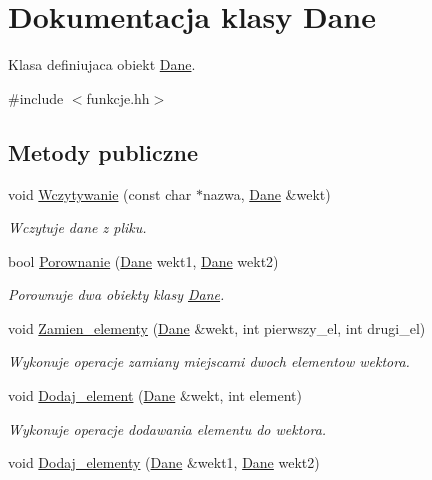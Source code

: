 \hypertarget{class_dane}{\section{\-Dokumentacja klasy \-Dane}
\label{class_dane}
}


\-Klasa definiujaca obiekt \hyperlink{class_dane}{\-Dane}.  




{\ttfamily \#include $<$funkcje.\-hh$>$}

\subsection*{\-Metody publiczne}
\begin{DoxyCompactItemize}
\item 
void \hyperlink{class_dane_a9866194fa136e3ae90a72124fd2dc8cc}{\-Wczytywanie} (const char $\ast$nazwa, \hyperlink{class_dane}{\-Dane} \&wekt)
\begin{DoxyCompactList}\small\item\em \-Wczytuje dane z pliku. \end{DoxyCompactList}\item 
bool \hyperlink{class_dane_a83f86229196e9c4349433e18e89b2e3d}{\-Porownanie} (\hyperlink{class_dane}{\-Dane} wekt1, \hyperlink{class_dane}{\-Dane} wekt2)
\begin{DoxyCompactList}\small\item\em \-Porownuje dwa obiekty klasy \hyperlink{class_dane}{\-Dane}. \end{DoxyCompactList}\item 
void \hyperlink{class_dane_a684a0900c65b3e3174cd3200463be874}{\-Zamien\-\_\-elementy} (\hyperlink{class_dane}{\-Dane} \&wekt, int pierwszy\-\_\-el, int drugi\-\_\-el)
\begin{DoxyCompactList}\small\item\em \-Wykonuje operacje zamiany miejscami dwoch elementow wektora. \end{DoxyCompactList}\item 
void \hyperlink{class_dane_a2bfe7d61ac562f0c420526857d097e47}{\-Dodaj\-\_\-element} (\hyperlink{class_dane}{\-Dane} \&wekt, int element)
\begin{DoxyCompactList}\small\item\em \-Wykonuje operacje dodawania elementu do wektora. \end{DoxyCompactList}\item 
void \hyperlink{class_dane_a1fa0b3e6a489d37ef07fa3f9dd996af2}{\-Dodaj\-\_\-elementy} (\hyperlink{class_dane}{\-Dane} \&wekt1, \hyperlink{class_dane}{\-Dane} wekt2)

\end{DoxyCompactItemize}
